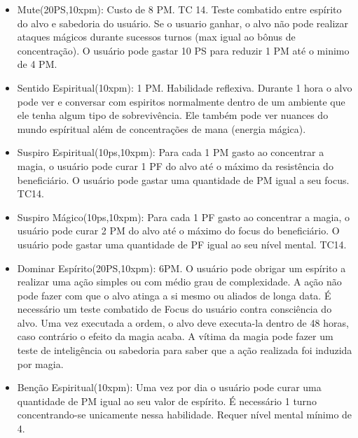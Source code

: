 \begin{itemize}
	\item Mute(20PS,10xpm): Custo de 8 PM. TC 14. \newline
Teste combatido entre espírito do alvo e sabedoria do usuário. Se o usuario ganhar, o alvo não pode realizar ataques mágicos durante sucessos turnos (max igual ao bônus de concentração). O usuário pode gastar 10 PS para reduzir 1 PM até o minimo de 4 PM.

	\item Sentido Espiritual(10xpm): 1 PM. Habilidade reflexiva.\newline
Durante 1 hora o alvo pode ver e conversar com espiritos normalmente dentro de um ambiente que ele tenha algum tipo de sobrevivência. Ele também pode ver nuances do mundo espíritual além de concentrações de mana (energia mágica). 

	\item Suspiro Espiritual(10ps,10xpm): Para cada 1 PM gasto ao concentrar a magia, o usuário pode curar 1 PF do alvo até o máximo da resistência do beneficiário. O usuário pode gastar uma quantidade de PM igual a seu focus. TC14.

	\item Suspiro Mágico(10ps,10xpm): Para cada 1 PF gasto ao concentrar a magia, o usuário pode curar 2 PM do alvo até o máximo do focus do beneficiário. O usuário pode gastar uma quantidade de PF igual ao seu nível mental. TC14.

\item Dominar Espírito(20PS,10xpm): 6PM.\newline
O usuário pode obrigar um espírito a realizar uma ação simples ou com médio grau de complexidade. A ação não pode fazer com que o alvo atinga a si mesmo ou aliados de longa data. É necessário um teste combatido de Focus do usuário contra consciência do alvo. Uma vez executada a ordem, o alvo deve executa-la dentro de 48 horas, caso contrário o efeito da magia acaba. A vítima da magia pode fazer um teste de inteligência ou sabedoria para saber que a ação realizada foi induzida por magia.


	\item Benção Espiritual(10xpm): Uma vez por dia o usuário pode curar uma quantidade de PM igual ao seu valor de espírito. É necessário 1 turno concentrando-se unicamente nessa habilidade. Requer nível mental mínimo de 4.


\end{itemize}

